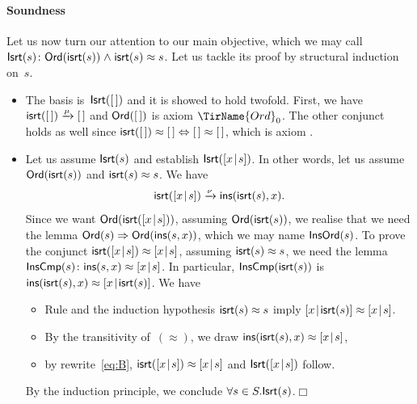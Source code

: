 \paragraph{Soundness}

Let us now turn our attention to our main objective, which we may call
\(\textsf{Isrt}({s})\colon \textsf{Ord}({\textsf{isrt}(s)}) \mathrel{\wedge}
\textsf{isrt}(s) \approx s\). Let us tackle
its proof by structural induction on~\(s\).
\begin{itemize}

  \item The basis is~\(\textsf{Isrt}({[\,]})\) and it is showed to hold
    twofold. First, we have \(\textsf{isrt}([\,])
    \xrightarrow{\smash{\mu}} [\,]\) and \(\textsf{Ord}({[\,]})\) is axiom
    \(\TirName{Ord}_0\). The other conjunct holds as well since
    \(\textsf{isrt}([\,]) \approx [\,] \Leftrightarrow [\,] \approx [\,]\),
    which is axiom .

  \item Let us assume \(\textsf{Isrt}({s})\) and establish
    \(\textsf{Isrt}({[{x}\!\mid\!{s}]})\). In other words, let us assume
    \(\textsf{Ord}({\textsf{isrt}(s)})\) and \(\textsf{isrt}(s) \approx s\). We
    have
    \begin{equation}
      \textsf{isrt}([{x}\!\mid\!{s}]) \xrightarrow{\smash{\nu}}
      \textsf{ins}(\textsf{isrt}(s),x).\label{eq:B}
    \end{equation}
    Since we want \(\textsf{Ord}({\textsf{isrt}([{x}\!\mid\!{s}])})\), assuming
    \(\textsf{Ord}({\textsf{isrt}(s)})\), we realise that we need the lemma
    \(\textsf{Ord}({s}) \Rightarrow \textsf{Ord}({\textsf{ins}(s,x)})\), which we
    may name \(\textsf{InsOrd}({s})\). To
    prove the conjunct \(\textsf{isrt}([{x}\!\mid\!{s}]) \approx
    [{x}\!\mid\!{s}]\), assuming \(\textsf{isrt}(s) \approx s\), we need the
    lemma \(\textsf{InsCmp}({s}) \colon \textsf{ins}(s,x) \approx
    [{x}\!\mid\!{s}]\). In particular, \(\textsf{InsCmp}({\textsf{isrt}(s)})\) is
    \(\textsf{ins}(\textsf{isrt}(s),x) \approx [{x}\!\mid\!{\textsf{isrt}(s)}]\). We
    have
    \begin{itemize}

      \item Rule  and the induction hypothesis
        \(\textsf{isrt}(s) \approx s\) imply \([{x}\!\mid\!{\textsf{isrt}(s)}]
        \approx [{x}\!\mid\!{s}]\).

      \item By the transitivity of~\((\approx)\), we draw
        \(\textsf{ins}(\textsf{isrt}(s),x) \approx [{x}\!\mid\!{s}]\),

      \item by rewrite~\eqref{eq:B}, \(\textsf{isrt}([{x}\!\mid\!{s}])
        \approx [{x}\!\mid\!{s}]\) and \(\textsf{Isrt}({[{x}\!\mid\!{s}]})\)
        follow.

    \end{itemize}
    By the induction principle, we conclude \(\forall s \in
    S.\textsf{Isrt}({s})\).\hfill\(\Box\)

\end{itemize}

